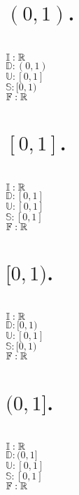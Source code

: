 \begin{parts}
 \part{$(0,1)$.}
 
\begin{solution}
 \\$\mathbb{I}: \mathbb{R}$ \\
 $\mathbb{D}: (0,1)$ \\
 $\mathbb{U}: [0,1]$ \\
 $\mathbb{S}: [0,1)$ \\
 $\mathbb{F}: \mathbb{R}$ \\
\end{solution}

 \part{$[0,1]$.}
 
 \begin{solution}
 \\$\mathbb{I}: \mathbb{R}$ \\
 $\mathbb{D}: [0,1]$ \\
 $\mathbb{U}: [0,1]$ \\
 $\mathbb{S}: [0,1]$ \\
 $\mathbb{F}: \mathbb{R}$ \\
\end{solution}

 \part{$[0,1)$.}
 
 \begin{solution}
 \\$\mathbb{I}: \mathbb{R}$ \\
 $\mathbb{D}: [0,1)$ \\
 $\mathbb{U}: [0,1]$ \\
 $\mathbb{S}: [0,1)$ \\
 $\mathbb{F}: \mathbb{R}$ \\
\end{solution}

 \part{$(0,1]$.}
 
 \begin{solution}
 \\$\mathbb{I}: \mathbb{R}$ \\
 $\mathbb{D}: (0,1]$ \\
 $\mathbb{U}: [0,1]$ \\
 $\mathbb{S}: [0,1]$ \\
 $\mathbb{F}: \mathbb{R}$ \\
\end{solution}


\end{parts}
